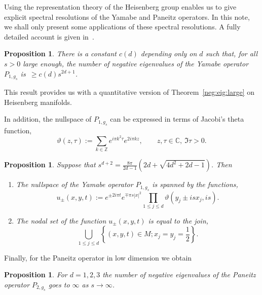 \documentclass{amsart}
\newtheorem{prop}[theorem]{Proposition}
\newtheorem{proposition}[theorem]{Proposition}
\theoremstyle{definition}
\theoremstyle{remark}
\begin{document}
Using the representation theory of the Heisenberg group enables us to
give explicit spectral resolutions of the Yamabe and Paneitz
operators. In this note, we shall only present some applications of
these spectral resolutions.  A fully detailed account is given
in~\cite{CGJP1}.
\begin{proposition}
    There is a constant $c(d)$ depending only on $d$ such that, for all $s>0$ large enough, the number of negative 
    eigenvalues of the Yamabe operator $P_{1,g_{s}}$ is~$\geq c(d)s^{2d+1}$. 
\end{proposition}
This result provides us with a quantitative version of Theorem~\ref{neg:eig:large} on Heisenberg manifolds. 

In addition, the nullspace of $P_{1,g_{s}}$ can be expressed in terms of Jacobi's theta function,
\begin{equation*}
    \vartheta(z,\tau):= \sum_{k\in {{\mathbb{Z}}}} e^{i\pi k^{2}\tau}e^{2i\pi k z},  \qquad z,\tau\in  
    \mathbb{C},\  \Im \tau>0. 
\end{equation*}

\begin{proposition}Suppose that $s^{d+2}=\frac{8\pi}{2d-1}\left(2d+\sqrt{4d^{2}+2d-1}\right)$. Then
    \begin{enumerate}
        \item  The nullspace of the Yamabe operator $P_{1,g_{s}}$ is spanned by the functions,
        \begin{equation*}
            u_{\pm}(x,y,t):=e^{\pm 2i\pi t}e^{\mp \pi s|x|^{2}} \prod_{1\leq j \leq d}\vartheta(y_{j}\pm i sx_{j}, is).
        \end{equation*}
    
        \item  The nodal set of the function $u_{\pm}(x,y,t)$ is equal to the join, 
        \begin{equation*}
           \bigcup_{1\leq j \leq d}\left\{(x,y,t)\in M;  x_{j}=y_{j}=\frac{1}{2}\right\}. 
        \end{equation*}
    \end{enumerate}
\end{proposition}

Finally, for the Paneitz operator in low dimension we obtain
\begin{prop}\label{Paneitz:nil:d=1,2,3} 
For $d=1,2,3$ the number of negative eigenvalues of the Paneitz operator $P_{2,g_{s}}$ goes to $\infty$ as $s\to\infty$.  
\end{prop}
\end{document}
